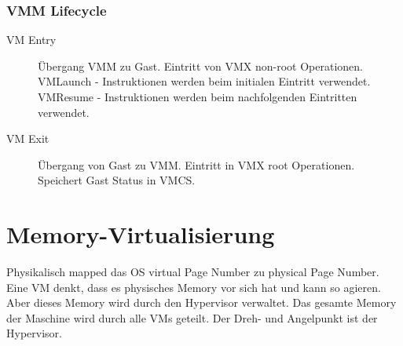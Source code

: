 \subsubsection{VMM Lifecycle}
\label{sec:vmm-lifecycle}
\begin{description}
	\item[VM Entry] Übergang VMM zu Gast. Eintritt von VMX non-root Operationen. VMLaunch - Instruktionen werden beim initialen Eintritt verwendet. VMResume - Instruktionen werden beim nachfolgenden Eintritten verwendet.
	\item[VM Exit] Übergang von Gast zu VMM. Eintritt in VMX root Operationen. Speichert Gast Status in VMCS.
\end{description}


\newpage
\section{Memory-Virtualisierung}
Physikalisch mapped das OS virtual Page Number zu physical Page Number. Eine VM denkt, dass es physisches Memory vor sich hat und kann so agieren. Aber dieses Memory wird durch den Hypervisor verwaltet. Das gesamte Memory der Maschine wird durch alle VMs geteilt. Der Dreh- und Angelpunkt ist der Hypervisor.

